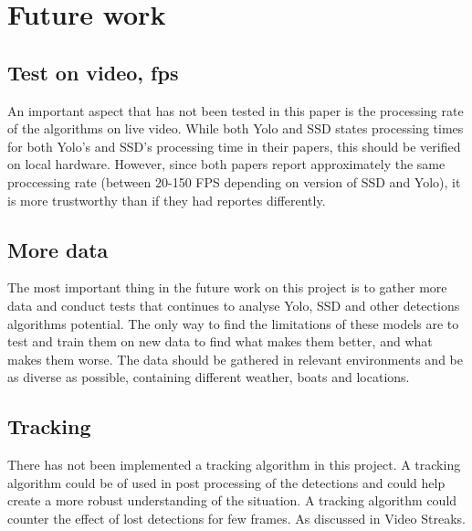 \section{Future work}
\subsection{Test on video, fps}
An important aspect that has not been tested in this paper is the processing rate of the algorithms on live video. While both Yolo and SSD states processing times for both Yolo's and SSD's processing time in their papers, this should be verified on local hardware. However, since both papers report approximately the same proccessing rate (between 20-150 FPS depending on version of SSD and Yolo), it is more trustworthy than if they had reportes differently.


\subsection{More data}
The most important thing in the future work on this project is to gather more data and conduct tests that continues to analyse Yolo, SSD and other detections algorithms potential. The only way to find the limitations of these models are to test and train them on new data to find what makes them better, and what makes them worse. The data should be gathered in relevant environments and be as diverse as possible, containing different weather, boats and locations.


\subsection{Tracking}
There has not been implemented a tracking algorithm in this project. A tracking algorithm could be of used in post processing of the detections and could help create a more robust understanding of the situation. A tracking algorithm could counter the effect of lost detections for few frames. As discussed in Video Streaks. 

